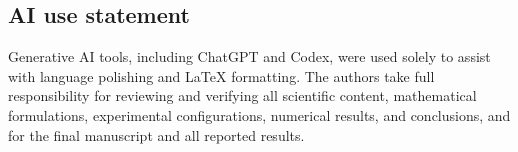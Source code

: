 \documentclass{article}
\begin{document}
\subsection*{AI use statement}
Generative AI tools, including ChatGPT and Codex, were used solely to assist with language polishing and LaTeX formatting. The authors take full responsibility for reviewing and verifying all scientific
content, mathematical formulations, experimental configurations, numerical
results, and conclusions, and for the final manuscript and all reported results.




\appendix





\FloatBarrier

\FloatBarrier

\FloatBarrier

\clearpage

\end{document}
